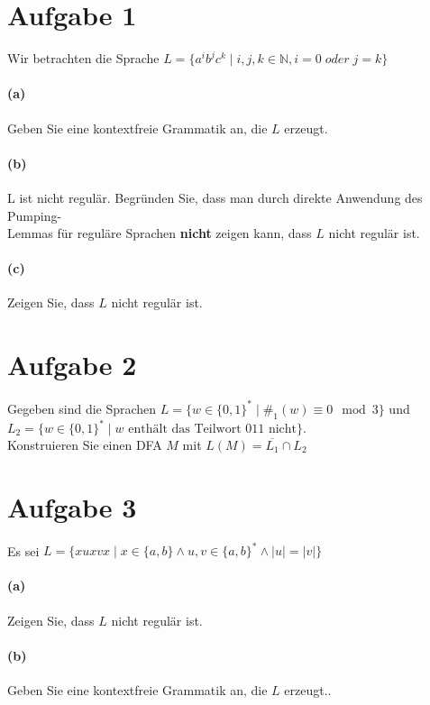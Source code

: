 \documentclass[titlepage]{article}
\renewcommand{\]}{\right]}
\renewcommand{\[}{\left[}
\renewcommand{\)}{\right)}
\renewcommand{\(}{\left(}
\renewcommand{\|}{\;|\;}
\begin{document}
\begingroup\let\clearpage\relax
	
	
	\section*{Aufgabe 1}
	Wir betrachten die Sprache $L=\{a^ib^jc^k\mid i,j,k\in\mathbb{N},i=0\;oder\;j=k\}$
		\paragraph{(a)} Geben Sie eine kontextfreie Grammatik an, die $L$ erzeugt.
		
		\paragraph{(b)} L ist nicht regulär. Begründen Sie, dass man durch direkte Anwendung des Pumping-\\Lemmas für reguläre Sprachen \textbf{nicht} zeigen kann, dass $L$ nicht regulär ist.
		
		\paragraph{(c)} Zeigen Sie, dass $L$ nicht regulär ist.
		
	\section*{Aufgabe 2}Gegeben sind die Sprachen $L=\{w\in\{0,1\}^*\mid\#_1(w)\equiv0\mod3\}$ und\\ $L_2=\{w\in\{0,1\}^*\mid w\text{ enthält das Teilwort 011 nicht}\}.$ \\Konstruieren Sie einen DFA $M$ mit $L(M)=\overline{L_1}\cap L_2$
	
	
	\section*{Aufgabe 3} Es sei $L=\{xuxvx\mid x\in\{a,b\}\land u,v\in\{a,b\}^*\land\mid u\mid=\mid v\mid\}$
		\paragraph{(a)} Zeigen Sie, dass $L$ nicht regulär ist.
		
		\paragraph{(b)} Geben Sie eine kontextfreie Grammatik an, die $L$ erzeugt..
		

\endgroup
\end{document}
